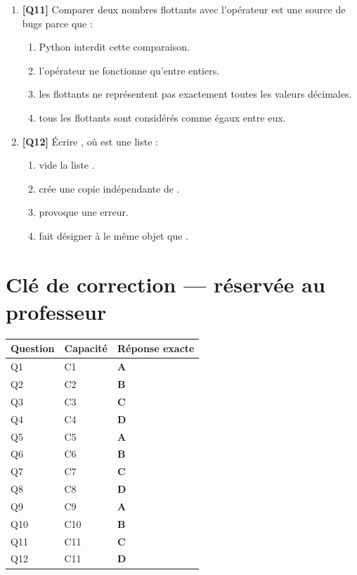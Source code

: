\begin{enumerate}
\item \textbf{[Q11]} Comparer deux nombres flottants avec l'opérateur \code{==} est une source de bugs parce que :
  \begin{enumerate}[label=\Alph*.]
    \item Python interdit cette comparaison.
    \item l'opérateur ne fonctionne qu'entre entiers.
    \item les flottants ne représentent pas exactement toutes les valeurs décimales.
    \item tous les flottants sont considérés comme égaux entre eux.
  \end{enumerate}

\item \textbf{[Q12]} Écrire , où  est une liste :
  \begin{enumerate}[label=\Alph*.]
    \item vide la liste .
    \item crée une copie indépendante de .
    \item provoque une erreur.
    \item fait désigner à  le même objet que .
  \end{enumerate}

\end{enumerate}

\ifnxVersionProfesseur
\clearpage
\section*{Clé de correction — réservée au professeur}

\begin{center}
\begin{tabular}{lll}
\hline
Question & Capacité & Réponse exacte \\
\hline
Q1 & C1 & \textbf{A} \\
Q2 & C2 & \textbf{B} \\
Q3 & C3 & \textbf{C} \\
Q4 & C4 & \textbf{D} \\
Q5 & C5 & \textbf{A} \\
Q6 & C6 & \textbf{B} \\
Q7 & C7 & \textbf{C} \\
Q8 & C8 & \textbf{D} \\
Q9 & C9 & \textbf{A} \\
Q10 & C10 & \textbf{B} \\
Q11 & C11 & \textbf{C} \\
Q12 & C11 & \textbf{D} \\
\hline
\end{tabular}
\end{center}

